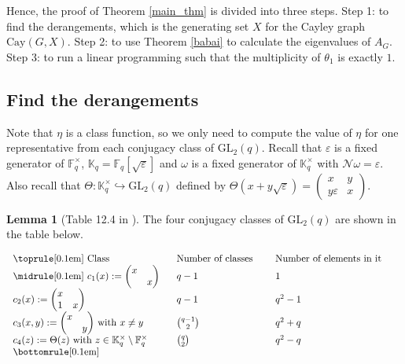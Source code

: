 \documentclass[12pt, reqno]{amsart}
\theoremstyle{definition}
\newtheorem{lemma}[theorem]{Lemma}
\theoremstyle{remark}
\numberwithin{equation}{section}
\newcommand{\BC}{\mathbb{C}}
\newcommand{\BF}{\mathbb{F}}
\newcommand{\BK}{\mathbb{K}}
\newcommand{\CN}{\mathcal{N}}
\newcommand{\pt}[1]{\left(#1\right)}
\newcommand{\cb}[1]{\left\{#1\right\}}
\newcommand{\fk}[1]{\left[#1\right]}
\newcommand{\GL}{\mathrm{GL}}
\newcommand{\Cay}{\mathrm{Cay}}
\newcommand{\jz}[4]{{\begin{pmatrix}
		#1&#2\\
		#3&#4
\end{pmatrix}}}
\begin{document}
Hence, the proof of Theorem \ref{main_thm} is divided into three steps. Step 1: to find the derangements, which is the generating set $X$ for the Cayley graph $\Cay(G, X)$. Step 2: to use Theorem \ref{babai} to calculate the eigenvalues of $A_G$. Step 3: to run a linear programming such that the multiplicity of $\theta_1$ is exactly $1$.


\subsection{Find the derangements}

Note that $\eta$ is a class function, so we only need to compute the value of $\eta$ for one representative from each conjugacy class of $\GL_2(q)$. Recall that $\varepsilon$ is a fixed generator of $\BF_q^\times$, $\BK_q = \BF_q\fk{\sqrt{\varepsilon}}$ and $\omega$ is a fixed generator of $\BK_q^\times$ with $\CN\omega = \varepsilon$. Also recall that $\Theta: \BK_q^\times \hookrightarrow \GL_2(q)$ defined by $\Theta(x + y\sqrt{\varepsilon}) = \jz{x}{y}{y\varepsilon}{x}$. 

\begin{lemma}[Table 12.4 in \cite{MR1878556}]\label{conjugacy_class}
	The four conjugacy classes of $\GL_2(q)$ are shown in the table below.
	
	\[\begin{tabular}{p{5.5cm}p{3.15cm}p{4.35cm}}
		\toprule[0.1em]
		
		Class & Number of classes & Number of elements in it \\
		
		\midrule[0.1em]
		
		$c_1(x) := \jz{x}{}{}{x}$ & $q - 1$ & $1$ \\
		
		$c_2(x) := \jz{x}{}{1}{x}$ & $q - 1$ & $q^2 - 1$ \\
		
		$c_3(x, y) := \jz{x}{}{}{y}$ with $x \ne y$ & $\binom{q - 1}{2}$ & $q^2 + q$ \\
		
		$c_4(z) := \Theta(z)$ with $z \in {\BK_q^\times} \setminus \BF_q^\times$ & $\binom{q}{2}$ & $q^2 - q$ \\
		
		\bottomrule[0.1em]
	\end{tabular}\]
	
\end{lemma}
\end{document}
